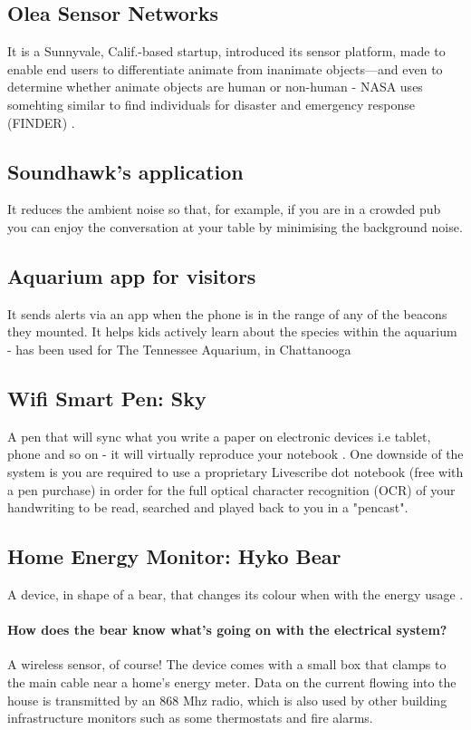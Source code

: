 \documentclass[12pt]{article}
\begin{document}
  \subsection {Olea Sensor Networks} It is a Sunnyvale, Calif.-based startup, introduced its sensor platform, made to enable end users to differentiate animate from inanimate objects—and even to determine whether animate objects are human or non-human -  NASA uses somehting similar to find individuals for disaster and emergency response (FINDER) \cite {olea}.

\subsection {Soundhawk's application} It reduces the ambient noise so that, for example, if you are in a crowded pub you can enjoy the conversation at your table by minimising the background noise.

 \subsection {Aquarium app for visitors} It sends alerts via an app when the phone is in the range of any of the beacons they mounted. It helps kids actively learn about the species within the aquarium -  has been used for The Tennessee Aquarium, in Chattanooga \cite {norman}

\subsection {Wifi Smart Pen: Sky}
A pen that will sync what you write a paper on electronic devices i.e tablet, phone and so on - it will virtually reproduce your notebook \cite {pen}.  One downside of the system is you are required to use a proprietary Livescribe dot notebook (free with a pen purchase) in order for the full optical character recognition (OCR) of your handwriting to be read, searched and played back to you in a "pencast".
\subsection {Home Energy Monitor: Hyko Bear} A device, in shape of a bear, that changes its colour when with the energy usage \cite {bear}. 

\paragraph {How does the bear know what’s going on with the electrical system?} A wireless sensor, of course! The device comes with a small box that clamps to the main cable near a home’s energy meter. Data on the current flowing into the house is transmitted by an 868 Mhz radio, which is also used by other building infrastructure monitors such as some thermostats and fire alarms.
\end{document}
